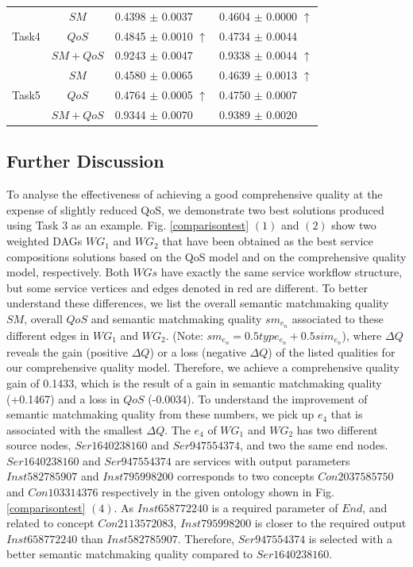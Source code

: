 \documentclass{llncs}
\begin{document}
\begin{table}[]
\begin{tabular}{c|c|l|l}
\multirow{3}{*}{Task4}  &$SM$      &0.4398 $\pm$ 0.0037               &0.4604 $\pm$ 0.0000 $\uparrow$ \\ \cline{2-4} 
                        &$QoS$     &0.4845 $\pm$ 0.0010 $\uparrow$    &0.4734 $\pm$ 0.0044            \\ \cline{2-4}
                        &$SM+QoS$  &0.9243 $\pm$ 0.0047               &0.9338 $\pm$ 0.0044 $\uparrow$           \\ \hline
\multirow{3}{*}{Task5}  &$SM$      &0.4580 $\pm$ 0.0065               &0.4639 $\pm$ 0.0013 $\uparrow$ \\ \cline{2-4} 
                        &$QoS$     &0.4764 $\pm$ 0.0005 $\uparrow$    &0.4750 $\pm$ 0.0007            \\ \cline{2-4}
                        &$SM+QoS$  &0.9344 $\pm$ 0.0070               &0.9389 $\pm$ 0.0020           \\ \hline
\end{tabular}
\end{table}
\vspace{-0.8cm}
\subsection{Further Discussion}\label{discuss1}
To analyse the effectiveness of achieving a good comprehensive quality at the expense of slightly reduced QoS, we demonstrate two best solutions produced using Task 3 as an example. Fig. \ref{comparisontest} $(1)$ and $(2)$ show two weighted DAGs $WG_1$ and $WG_2$ that have been obtained as the best service compositions solutions based on the QoS model and on the comprehensive quality model, respectively. Both $WGs$ have exactly the same service workflow structure, but some service vertices and edges denoted in red are different. To better understand these differences, we list the overall semantic matchmaking quality $SM$,  overall $QoS$ and semantic matchmaking quality $sm_{e_n}$ associated to these different edges in $WG_1$ and $WG_2$. (Note: $sm_{e_n} = 0.5type_{e_n} + 0.5 sim_{e_n}$), where $\Delta Q$ reveals the gain (positive $\Delta Q$) or a loss (negative $\Delta Q$) of the listed qualities for our comprehensive quality model. Therefore, we achieve a comprehensive quality gain of 0.1433, which is the result of a gain in semantic matchmaking quality (+0.1467) and a loss in $QoS$ (-0.0034). To understand the improvement of semantic matchmaking quality from these numbers, we pick up $e_4$ that is associated with the smallest $\Delta Q$. The $e_4$ of $WG_1$ and $WG_2$ has two different source nodes, $Ser1640238160$ and $Ser947554374$, and two the same end nodes. $Ser1640238160$ and $Ser947554374$ are services with output parameters $Inst582785907$ and  $Inst795998200$ corresponds to two concepts $Con2037585750$ and $Con103314376$ respectively in the given ontology shown in Fig. \ref{comparisontest} $(4)$. As $Inst658772240$ is a required parameter of $End$, and related to concept $Con2113572083$, $Inst795998200$ is closer to the required output $Inst658772240$ than $Inst582785907$. Therefore,  $Ser947554374$ is selected with a better semantic matchmaking quality compared to $Ser1640238160$.
\vspace{-0.6cm}
\end{document}
